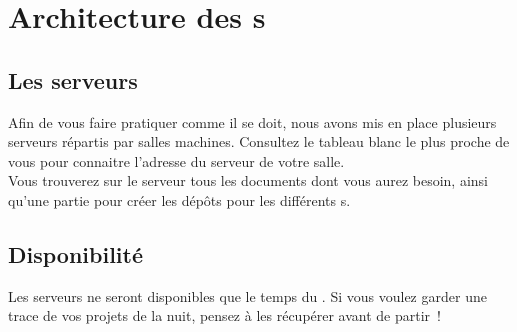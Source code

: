 \chapter{Architecture des \tp s}

\section{Les serveurs}

Afin de vous faire pratiquer comme il se doit, nous avons mis en place plusieurs serveurs répartis par salles machines. Consultez le tableau blanc le plus proche de vous pour connaitre l'adresse du serveur de votre salle.\\

Vous trouverez sur le serveur tous les documents dont vous aurez besoin, ainsi qu'une partie pour créer les dépôts pour les différents \tp s.

\section{Disponibilité}

Les serveurs ne seront disponibles que le temps du \tp. Si vous voulez garder une trace de vos projets de la nuit, pensez à les récupérer avant de partir~!